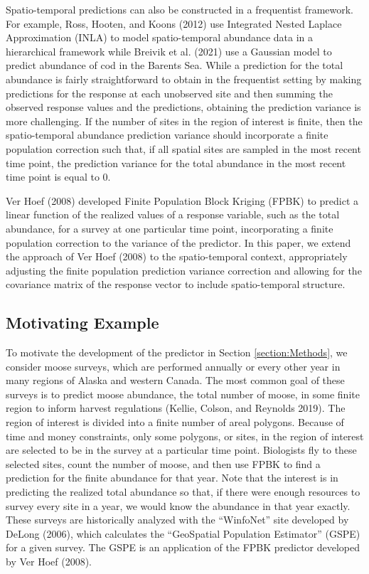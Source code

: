 \documentclass[smallextended]{svjour3}       %
\begin{document}
Spatio-temporal predictions can also be constructed in a frequentist
framework. For example, Ross, Hooten, and Koons (2012) use Integrated
Nested Laplace Approximation (INLA) to model spatio-temporal abundance
data in a hierarchical framework while Breivik et al. (2021) use a
Gaussian model to predict abundance of cod in the Barents Sea. While a
prediction for the total abundance is fairly straightforward to obtain
in the frequentist setting by making predictions for the response at
each unobserved site and then summing the observed response values and
the predictions, obtaining the prediction variance is more challenging.
If the number of sites in the region of interest is finite, then the
spatio-temporal abundance prediction variance should incorporate a
finite population correction such that, if all spatial sites are sampled
in the most recent time point, the prediction variance for the total
abundance in the most recent time point is equal to 0.

Ver Hoef (2008) developed Finite Population Block Kriging (FPBK) to
predict a linear function of the realized values of a response variable,
such as the total abundance, for a survey at one particular time point,
incorporating a finite population correction to the variance of the
predictor. In this paper, we extend the approach of Ver Hoef (2008) to
the spatio-temporal context, appropriately adjusting the finite
population prediction variance correction and allowing for the
covariance matrix of the response vector to include spatio-temporal
structure.

\hypertarget{motivating-example}{%
\subsection{Motivating Example}\label{motivating-example}}

To motivate the development of the predictor in Section
\ref{section:Methods}, we consider moose surveys, which are performed
annually or every other year in many regions of Alaska and western
Canada. The most common goal of these surveys is to predict moose
abundance, the total number of moose, in some finite region to inform
harvest regulations (Kellie, Colson, and Reynolds 2019). The region of
interest is divided into a finite number of areal polygons. Because of
time and money constraints, only some polygons, or sites, in the region
of interest are selected to be in the survey at a particular time point.
Biologists fly to these selected sites, count the number of moose, and
then use FPBK to find a prediction for the finite abundance for that
year. Note that the interest is in predicting the realized total
abundance so that, if there were enough resources to survey every site
in a year, we would know the abundance in that year exactly. These
surveys are historically analyzed with the ``WinfoNet'' site developed
by DeLong (2006), which calculates the ``GeoSpatial Population
Estimator'' (GSPE) for a given survey. The GSPE is an application of the
FPBK predictor developed by Ver Hoef (2008).
\end{document}
